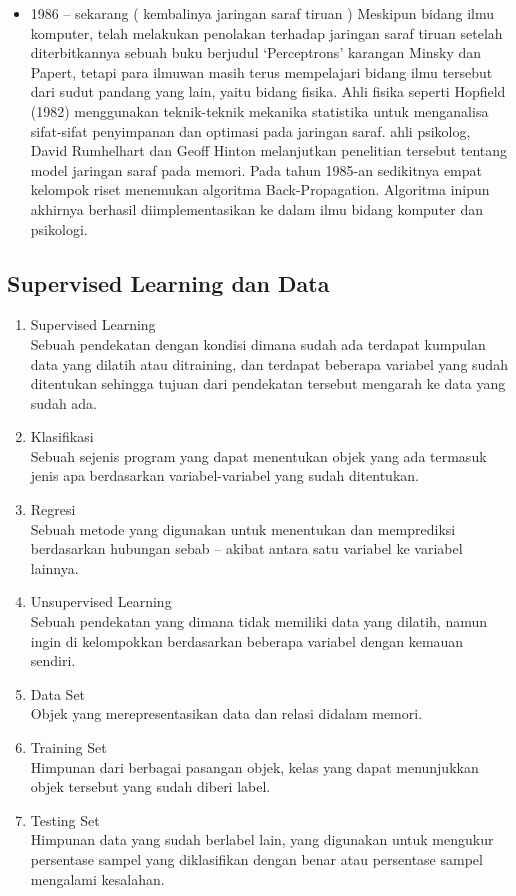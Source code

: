 \begin{enumerate}
\begin{itemize}
    \item 1986 – sekarang ( kembalinya jaringan saraf tiruan )
    Meskipun bidang ilmu komputer, telah melakukan penolakan terhadap jaringan saraf tiruan setelah diterbitkannya sebuah buku berjudul ‘Perceptrons’ karangan Minsky dan Papert, tetapi para ilmuwan masih terus mempelajari bidang ilmu tersebut dari sudut pandang yang lain, yaitu bidang fisika. Ahli fisika seperti Hopfield (1982) menggunakan teknik-teknik mekanika statistika untuk menganalisa sifat-sifat penyimpanan dan optimasi pada jaringan saraf. ahli psikolog, David Rumhelhart dan Geoff Hinton melanjutkan penelitian tersebut tentang model jaringan saraf pada memori. Pada tahun 1985-an sedikitnya empat kelompok riset menemukan algoritma Back-Propagation. Algoritma inipun akhirnya berhasil diimplementasikan ke dalam ilmu bidang komputer dan psikologi.
	\end{itemize}		
\end{enumerate}


\subsection{Supervised Learning dan Data}
\begin{enumerate}
	\item Supervised Learning\\
	Sebuah pendekatan dengan kondisi dimana sudah ada terdapat kumpulan data yang dilatih atau ditraining, dan terdapat beberapa variabel yang sudah ditentukan sehingga tujuan dari pendekatan tersebut mengarah ke data yang sudah ada.
	
	\item Klasifikasi\\
	Sebuah sejenis program yang dapat menentukan objek yang ada termasuk jenis apa berdasarkan variabel-variabel yang sudah ditentukan.
	
	\item Regresi\\
	Sebuah metode yang digunakan untuk menentukan dan memprediksi berdasarkan hubungan sebab – akibat antara satu variabel ke variabel lainnya.
	
	\item Unsupervised Learning\\
	Sebuah pendekatan yang dimana tidak memiliki data yang dilatih, namun ingin di kelompokkan berdasarkan beberapa variabel dengan kemauan sendiri.
	
	\item Data Set\\
	Objek yang merepresentasikan data dan relasi didalam memori.

	\item Training Set\\
	Himpunan dari berbagai pasangan objek, kelas yang dapat menunjukkan objek tersebut yang sudah diberi label.

	\item Testing Set\\
	Himpunan data yang sudah berlabel lain, yang digunakan untuk mengukur persentase sampel yang diklasifikan dengan benar atau persentase sampel mengalami kesalahan.

\end{enumerate}
